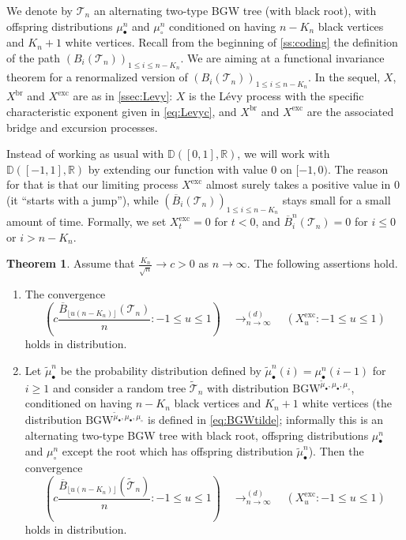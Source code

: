 \documentclass[10pt]{amsart}
\theoremstyle{definition}\newtheorem{defi}[theo]{Definition}\newtheorem{rema}[theo]{Remark}\newtheorem{exam}[theo]{Example}\newtheorem{exem}[theo]{Example}\newtheorem{nota}[theo]{Notation}
\newcommand{\R}{\mathbb{R}}
\newcommand{\D}{\mathbb{D}}
\def\tmub{\widetilde{\mu}_{\bullet}}
\def\mub{\mu_{\bullet}}
\def\muc{\mu_{\circ}}
\def\mubn{\mu_{\bullet}^{n}}
\def\mucn{\mu_{\circ}^{n}}
\def\oB{\overline{B}}
\def \Xexc{X^{\mathrm{exc}}}
\def \Xbr{X^{\mathrm{br}}}
\newcommand\BGW{\textrm{BGW}}
\def\Ts{\mathscr{T}}
\newtheorem{theorem}[theo]{Theorem}\newtheorem{lemma}[theo]{Lemma}\newtheorem{proposition}[theo]{Proposition}\newtheorem{corollary}[theo]{Corollary}\newtheorem{remark}[theo]{Remark}
\begin{document}
\enlargethispage*{1em}%
We denote by $ \Ts_{n}$ an alternating two-type BGW tree (with black root), with offspring distributions $\mubn$ and $\mucn$ conditioned on having $n-K_{n}$ black vertices and $K_{n}+1$ white vertices.  Recall from the beginning of \cref{ss:coding} the definition of the path $(B_{i}(\Ts_{n}))_{1 \leq i \leq n-K_{n}}$.
We are aiming at a functional invariance theorem for a renormalized version of $(B_{i}(\Ts_{n}))_{1 \leq i \leq n-K_{n}}$.
In the sequel, $X$, $\Xbr$ and $\Xexc$ are as in \cref{ssec:Levy}:
$X$ is the L\'evy process with the specific characteristic exponent given in \eqref{eq:Levyc},
and $\Xbr$ and $\Xexc$ are the associated bridge and excursion processes.

Instead of working as usual with $\D([0,1],\R)$, we will work with $\D([-1,1],\R)$
by extending our function with value $0$ on $[-1,0)$.
The reason for that is that our limiting process $\Xexc$ almost surely
takes a positive value in $0$ (it ``starts with a jump''),
while $(\oB_{i}(\Ts_{n}))_{1 \leq i \leq n-K_{n}}$ stays small for a small amount of time.
Formally, we set $\Xexc_{t}=0$ for $t<0$,
and $\overline{B}^{n}_{i}(\Ts_n)=0$ for $i \leq 0$ or $i>n-K_{n}$.


\begin{theorem}\label{thm:cvXexc} Assume that $ \tfrac{K_{n}}{\sqrt{n}} \rightarrow c>0$ as $n \rightarrow \infty$. The following assertions hold.
\begin{enumerate}
\item[(i)] The convergence \[  \left(  c \frac{\oB_{\lfloor u (n-K_{n}) \rfloor}(\Ts_{n})}{ n} : -1 \leq u \leq 1\right)  \quad \mathop{\longrightarrow}^{(d)}_{n \rightarrow \infty} \quad (\Xexc_{u}: -1 \leq u \leq 1)\]
holds in distribution.
\item[(ii)]
  Let $\widetilde{\mu}^{n}_{\bullet}$ be the probability distribution defined by
  $\widetilde{\mu}^{n}_{\bullet}(i)=\mubn(i-1)$ for $i \geq 1$
  and consider a random tree $\tilde{\Ts}_{n}$ with distribution ${\BGW}^{\tmub,\mub,\muc}$,
  conditioned on having $n-K_{n}$ black vertices and $K_{n}+1$ white vertices
  (the distribution ${\BGW}^{\tmub,\mub,\muc}$ is defined in \eqref{eq:BGWtilde}; informally this is an alternating two-type BGW tree with black root, offspring distributions $\mubn$ and $\mucn$ except the root which has offspring distribution $\widetilde{\mu}^{n}_{\bullet}$).
  Then the convergence
  \[  \left(  c \frac{\oB_{\lfloor u (n-K_{n}) \rfloor}(\tilde{\Ts}_{n})}{ n} : -1 \leq u \leq 1\right)  \quad \mathop{\longrightarrow}^{(d)}_{n \rightarrow \infty} \quad (\Xexc_{u}: -1 \leq u \leq 1)\]
holds in distribution.
\end{enumerate}
\end{theorem}
\end{document}
